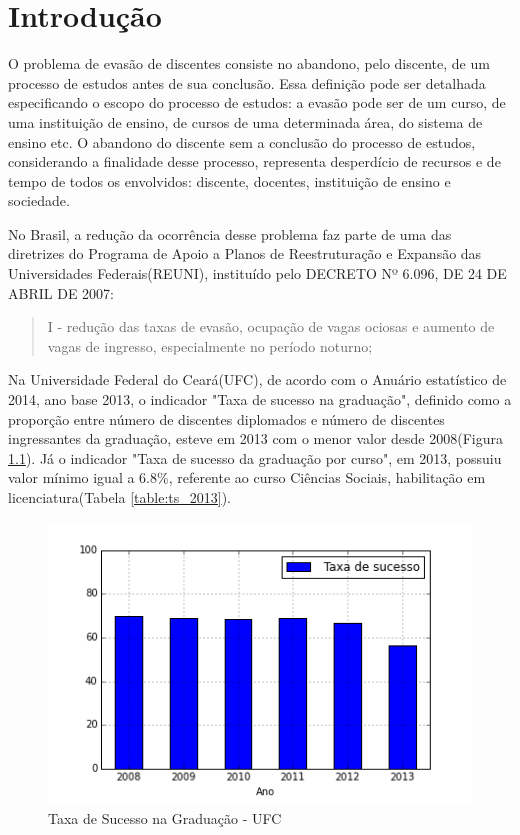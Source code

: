 \chapter{Introdução}


O problema de evasão de discentes consiste no abandono, pelo discente, de um processo de estudos antes de sua conclusão. Essa definição pode ser detalhada especificando o escopo do processo de estudos: a evasão pode ser de um curso, de uma instituição de ensino, de cursos de uma determinada área, do sistema de ensino etc. O abandono do discente sem a conclusão do processo de estudos, considerando a finalidade desse processo, representa desperdício de recursos e de tempo de todos os envolvidos: discente, docentes, instituição de ensino e sociedade.


No Brasil, a redução da ocorrência desse problema faz parte de uma das diretrizes do Programa de Apoio a Planos de Reestruturação e Expansão das Universidades Federais(REUNI), instituído pelo DECRETO Nº 6.096, DE 24 DE ABRIL DE 2007:

\begin{quote}
I - redução das taxas de evasão, ocupação de vagas ociosas e aumento de vagas de ingresso, especialmente no período noturno;
\end{quote}


Na Universidade Federal do Ceará(UFC), de acordo com o Anuário estatístico de 2014, ano base 2013, o indicador "Taxa de sucesso na graduação", definido como a proporção entre número de discentes diplomados e número de discentes ingressantes da graduação, esteve em 2013 com o menor valor desde 2008(Figura \ref{img:taxa-de-sucesso-ufc}). Já o indicador "Taxa de sucesso da graduação por curso", em 2013, possuiu valor mínimo igual a 6.8\%, referente ao curso Ciências Sociais, habilitação em licenciatura(Tabela \ref{table:ts_2013}).

\begin{figure}[H]
	\includegraphics[scale=0.8]{img/taxa-de-sucesso-ufc.png}
	\caption{Taxa de Sucesso na Graduação - UFC}
	\label{img:taxa-de-sucesso-ufc}
\end{figure}

